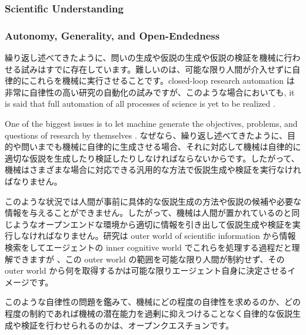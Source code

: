 \subsubsection{Scientific Understanding}

\subsubsection{Autonomy, Generality, and Open-Endedness}
繰り返し述べてきたように、問いの生成や仮説の生成や仮説の検証を機械に行わせる試みはすでに存在しています。難しいのは、可能な限り人間が介入せずに自律的にこれらを機械に実行させることです。closed-loop research automation は非常に自律性の高い研究の自動化の試みですが、このような場合においても,  it is said that full automation of all processes of science is yet to be realized \cite{zenil2023,coley2020autonomous,coley2020autonomousII}. 

One of the biggest issues is to let machine generate the objectives, problems, and questions of research by themselves \cite{coley2020autonomousII}. なぜなら、繰り返し述べてきたように、目的や問いまでも機械に自律的に生成させる場合、それに対応して機械は自律的に適切な仮説を生成したり検証したりしなければならないからです。したがって、機械はさまざまな場合に対応できる汎用的な方法で仮説生成や検証を実行なければなりません。

このような状況では人間が事前に具体的な仮説生成の方法や仮説の候補や必要な情報を与えることができません。したがって、機械は人間が置かれているのと同じようなオープンエンドな環境から適切に情報を引き出して仮説生成や検証を実行しなければなりません。研究は outer world
of scientific information から情報検索をしてエージェントの inner cognitive world でこれらを処理する過程だと理解できますが \cite{hope2022computational}、この outer world の範囲を可能な限り人間が制約せず、その outer world から何を取得するかは可能な限りエージェント自身に決定させるイメージです。

このような自律性の問題を鑑みて、機械にどの程度の自律性を求めるのか、どの程度の制約であれば機械の潜在能力を過剰に抑えつけることなく自律的な仮説生成や検証を行わせられるのかは、オープンクエスチョンです。


